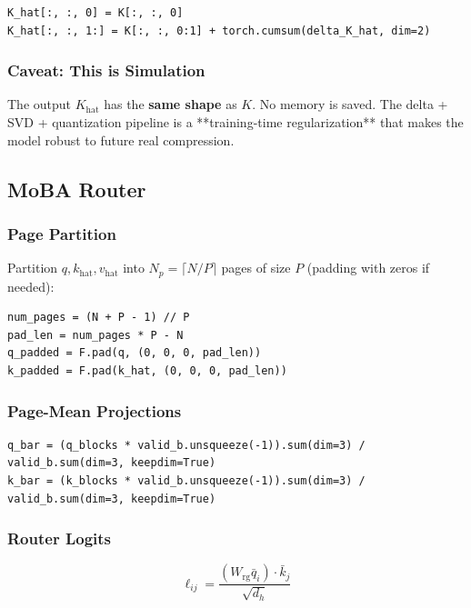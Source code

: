 \begin{lstlisting}
K_hat[:, :, 0] = K[:, :, 0]
K_hat[:, :, 1:] = K[:, :, 0:1] + torch.cumsum(delta_K_hat, dim=2)
\end{lstlisting}

\subsubsection{Caveat: This is Simulation}

The output $K_\text{hat}$ has the \textbf{same shape} as $K$. No memory is 
saved. The delta + SVD + quantization pipeline is a **training-time 
regularization** that makes the model robust to future real compression.

\subsection{MoBA Router}

\subsubsection{Page Partition}

Partition $q, k_\text{hat}, v_\text{hat}$ into $N_p = \lceil N / P \rceil$ 
pages of size $P$ (padding with zeros if needed):

\begin{lstlisting}
num_pages = (N + P - 1) // P
pad_len = num_pages * P - N
q_padded = F.pad(q, (0, 0, 0, pad_len))
k_padded = F.pad(k_hat, (0, 0, 0, pad_len))
\end{lstlisting}

\subsubsection{Page-Mean Projections}

\begin{lstlisting}
q_bar = (q_blocks * valid_b.unsqueeze(-1)).sum(dim=3) / valid_b.sum(dim=3, keepdim=True)
k_bar = (k_blocks * valid_b.unsqueeze(-1)).sum(dim=3) / valid_b.sum(dim=3, keepdim=True)
\end{lstlisting}

\subsubsection{Router Logits}

\[
\ell_{ij} = \frac{(W_\text{rg} \bar{q}_i) \cdot \bar{k}_j}{\sqrt{d_h}}
\tag{4.1}
\]


